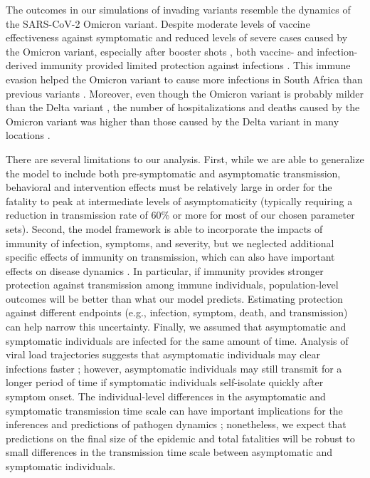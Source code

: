 \documentclass[12pt]{article}
\begin{document}
The outcomes in our simulations of invading variants resemble the dynamics of the SARS-CoV-2 Omicron variant.
Despite moderate levels of vaccine effectiveness against symptomatic and reduced levels of severe cases caused by the Omicron variant, especially after booster shots \cite{andres2022omicron}, both vaccine- and infection-derived immunity provided limited protection against infections \cite{pearson2021omicron}.
This immune evasion helped the Omicron variant to cause more infections in South Africa than previous variants \cite{sun2022omicron}.
Moreover, even though the Omicron variant is probably milder than the Delta variant \cite{MENNI20221618,ulloa2022estimates}, the number of hospitalizations and deaths caused by the Omicron variant was higher than those caused by the Delta variant in many locations \cite{Iacobuccio254,faust2022omicron,sigal2022estimating}.

There are several limitations to our analysis.
First, while we are able to generalize the model to include both pre-symptomatic and asymptomatic transmission, behavioral and intervention effects must be relatively large in order for the fatality to peak at intermediate levels of asymptomaticity (typically requiring a reduction in transmission rate of 60\% or more for most of our chosen parameter sets).
Second, the model framework is able to incorporate the impacts of immunity of infection, symptoms, and severity,
but we neglected additional specific effects of immunity on transmission, which can also have important effects on disease dynamics \cite{saad2020immune,gallagher2021indirect}.
In particular, if immunity provides stronger protection against transmission among immune individuals, population-level outcomes will be better than what our model predicts.
Estimating protection against different endpoints (e.g., infection, symptom, death, and transmission) can help narrow this uncertainty.
Finally, we assumed that asymptomatic and symptomatic individuals are infected for the same amount of time.
Analysis of viral load trajectories suggests that asymptomatic individuals may clear infections faster \cite{Kissler2020};
however, asymptomatic individuals may still transmit for a longer period of time if symptomatic individuals self-isolate quickly after symptom onset.
The individual-level differences in the asymptomatic and symptomatic transmission time scale can have important implications for the inferences and predictions of pathogen dynamics \cite{park2020time,harris2023time};
nonetheless, we expect that predictions on the final size of the epidemic and total fatalities will be robust to small differences in the transmission time scale between asymptomatic and symptomatic individuals.
\end{document}
